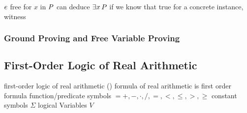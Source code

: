                     \begin{calculus}
                    \end{calculus}

                    $e$ free for $x$ in $P$
                    can deduce $\exists x{\,} P$ if we know that true for a concrete instance, witness

            \subsubsection{Ground Proving and Free Variable Proving}
                \label{sec:ground-proving-free-variable-proving}



        \subsection{First-Order Logic of Real Arithmetic}
            \label{sec:FOL-R}

            first-order logic of real arithmetic (\FOLR)
            formula of real arithmetic
            is first order formula
            function/predicate symbols $ = {+,-,\cdot,/,=,<,\leq,>,\geq}$
            constant symbols $\Sigma$
            logical Variables $V$


